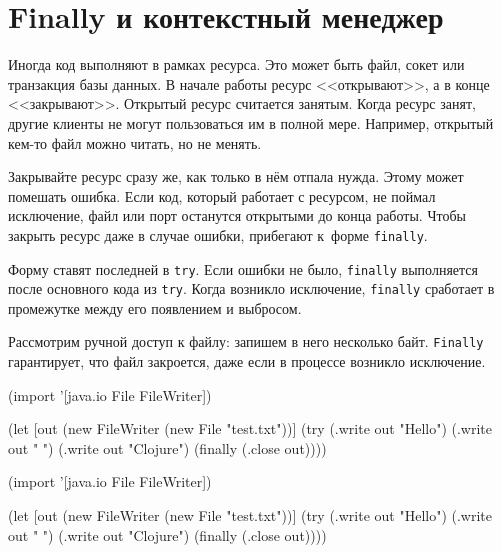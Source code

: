 
\section{Finally и контекстный менеджер}

Иногда код выполняют в рамках ресурса. Это может быть файл, сокет или транзакция
базы данных. В начале работы ресурс <<открывают>>, а в конце
<<закрывают>>. Открытый ресурс считается занятым. Когда ресурс занят, другие
клиенты не могут пользоваться им в полной мере. Например, открытый кем-то файл
можно читать, но не менять.

Закрывайте ресурс сразу же, как только в нём отпала нужда. Этому может
помешать ошибка. Если код, который работает с ресурсом, не поймал исключение,
файл или порт останутся открытыми до конца работы. Чтобы закрыть ресурс даже в
случае ошибки, прибегают к~форме \verb|finally|.

Форму ставят последней в \verb|try|. Если ошибки не было, \verb|finally|
выполняется после основного кода из \verb|try|. Когда возникло исключение,
\verb|finally| сработает в промежутке между его появлением и выбросом.

Рассмотрим ручной доступ к файлу: запишем в него несколько
байт. \verb|Finally| гарантирует, что файл закроется, даже если в процессе
возникло исключение.

\ifnarrow

\begin{english}
  \begin{clojure}
(import '[java.io File FileWriter])

(let [out (new FileWriter
            (new File "test.txt"))]
  (try
    (.write out "Hello")
    (.write out " ")
    (.write out "Clojure")
    (finally
      (.close out))))
  \end{clojure}
\end{english}

\else

\begin{english}
  \begin{clojure}
(import '[java.io File FileWriter])

(let [out (new FileWriter (new File "test.txt"))]
  (try
    (.write out "Hello")
    (.write out " ")
    (.write out "Clojure")
    (finally
      (.close out))))
  \end{clojure}
\end{english}

\fi

